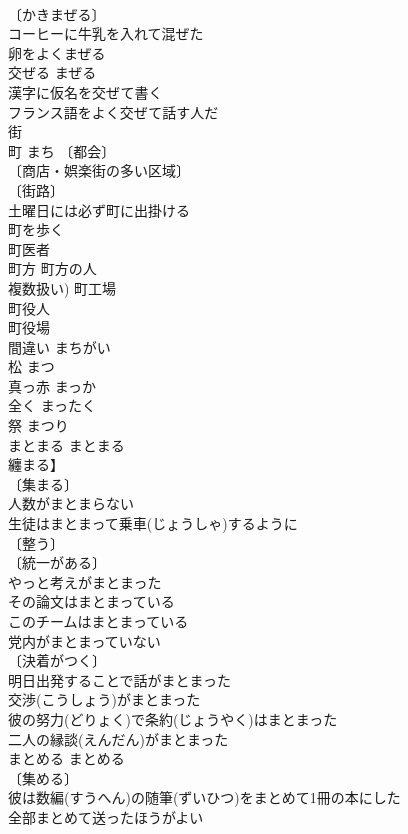 \documentclass[8pt]{extreport}
\begin{document}
\begin{CJK}{UTF8}{min}
\\	〔かきまぜる〕
\\	コーヒーに牛乳を入れて混ぜた 
\\	卵をよくまぜる 
\\	交ぜる	まぜる	
\\	漢字に仮名を交ぜて書く 
\\	フランス語をよく交ぜて話す人だ 
\\	街　
\\	町	まち	〔都会〕
\\	〔商店・娯楽街の多い区域〕
\\	〔街路〕
\\	土曜日には必ず町に出掛ける 
\\	町を歩く 
\\	町医者 
\\	町方 町方の人 
\\	複数扱い) 町工場 
\\	町役人 
\\	町役場 
\\	間違い	まちがい	
\\	松	まつ	
\\	真っ赤	まっか	
\\	全く	まったく	
\\	祭	まつり	
\\	まとまる	まとまる
\\	纏まる】	
\\	〔集まる〕
\\	人数がまとまらない 
\\	生徒はまとまって乗車(じょうしゃ)するように 
\\	〔整う〕
\\	〔統一がある〕
\\	やっと考えがまとまった 
\\	その論文はまとまっている 
\\	このチームはまとまっている 
\\	党内がまとまっていない 
\\	〔決着がつく〕
\\	明日出発することで話がまとまった 
\\	交渉(こうしょう)がまとまった 
\\	彼の努力(どりょく)で条約(じょうやく)はまとまった 
\\	二人の縁談(えんだん)がまとまった 
\\	まとめる	まとめる	
\\	〔集める〕
\\	彼は数編(すうへん)の随筆(ずいひつ)をまとめて1冊の本にした 
\\	全部まとめて送ったほうがよい 

\end{CJK}
\end{document}
